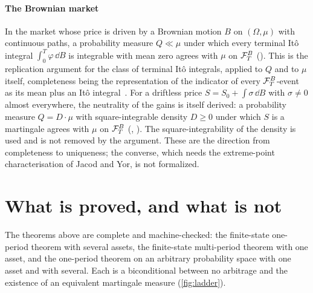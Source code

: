 \documentclass[11pt]{article}
\begin{document}
\paragraph{The Brownian market}
In the market whose price is driven by a Brownian motion $B$ on $(\Omega,\mu)$ with continuous paths, a probability measure $Q\ll\mu$ under which
every terminal It\^o integral $\int_0^T\varphi\,\dd B$ is integrable with mean zero agrees with $\mu$ on $\mathcal{F}^B_T$
(). This is the replication argument for the class of terminal It\^o integrals, applied to $Q$ and to
$\mu$ itself, completeness being the representation of the indicator of every $\mathcal{F}^B_T$-event as its mean plus an It\^o
integral~\cite{CoelhoIto}. For a driftless price $S=S_0+\int\sigma\,\dd B$ with $\sigma\neq0$ almost everywhere, the neutrality of the
gains is itself derived: a probability measure $Q=D\cdot\mu$ with square-integrable density $D\ge0$ under which $S$ is a martingale agrees with $\mu$ on
$\mathcal{F}^B_T$ (, ).
The square-integrability of the density is used and is not removed by the argument. These are the direction from completeness to uniqueness; the
converse, which needs the extreme-point characterisation of Jacod and Yor, is not formalized.

\section{What is proved, and what is not}\label{sec:boundary}

The theorems above are complete and machine-checked: the finite-state one-period theorem with several
assets, the finite-state multi-period theorem with one asset, and the one-period theorem on an arbitrary
probability space with one asset and with several. Each is a biconditional between no arbitrage and the
existence of an equivalent martingale measure (\cref{fig:ladder}).
\end{document}
